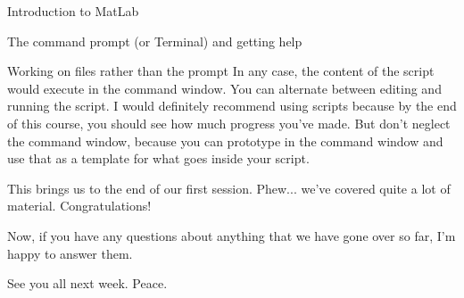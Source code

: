 \documentclass[11pt, oneside]{report}   	%
\begin{document}
\begin{chapter}{Introduction to MatLab}
\begin{section}{The command prompt (or Terminal) and getting help}
\begin{subsection}{Working on files rather than the prompt}
In any case, the content of the script would execute in the command window. You can alternate between editing
and running the script. I would definitely recommend using scripts because by the end of this course, you should
see how much progress you've made. But don't neglect the command window, because you can prototype in the
command window and use that as a template for what goes inside your script.
\end{subsection}

This brings us to the end of our first session. Phew... we've covered quite a lot of material. Congratulations!

Now, if you have any questions about anything that we have gone over so far, I'm happy to answer them.

See you all next week. Peace.

\end{section}

\end{chapter}
\end{document}
